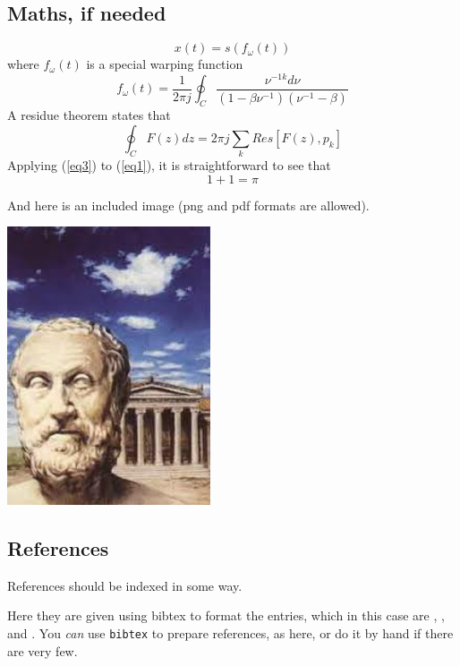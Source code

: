 \documentclass[10pt,a4paper,twocolumn]{article}
\begin{document}
\subsection{Maths, if needed}

%
\begin{equation}
x(t) = s(f_\omega(t))
\label{eq1}
\end{equation}
where \(f_\omega(t)\) is a special warping function
\begin{equation}
f_\omega(t)=\frac{1}{2\pi j}\oint_C \frac{\nu^{-1k}d\nu}
{(1-\beta\nu^{-1})(\nu^{-1}-\beta)}
\label{eq2}
\end{equation}
A residue theorem states that
\begin{equation}
\oint_C F(z)dz=2 \pi j \sum_k Res[F(z),p_k]
\label{eq3}
\end{equation}
Applying (\ref{eq3}) to (\ref{eq1}), 
it is straightforward to see that
\begin{equation}
1 + 1 = \pi
\label{eq4}
\end{equation}

And here is an included image (png and pdf formats are allowed).

\begin{center}
  \includegraphics[width=6cm]
  {carneades.png}
\end{center}
\subsection{References}

References should be indexed in some way.

Here they are given  using bibtex to format the entries, which 
in this case are
\cite{ES1}, \cite{ES2}, and \cite{ES3}. 
You \emph{can} use \texttt{bibtex} to prepare references, as here,
or do it by hand if there are very few.

%


\end{document}
